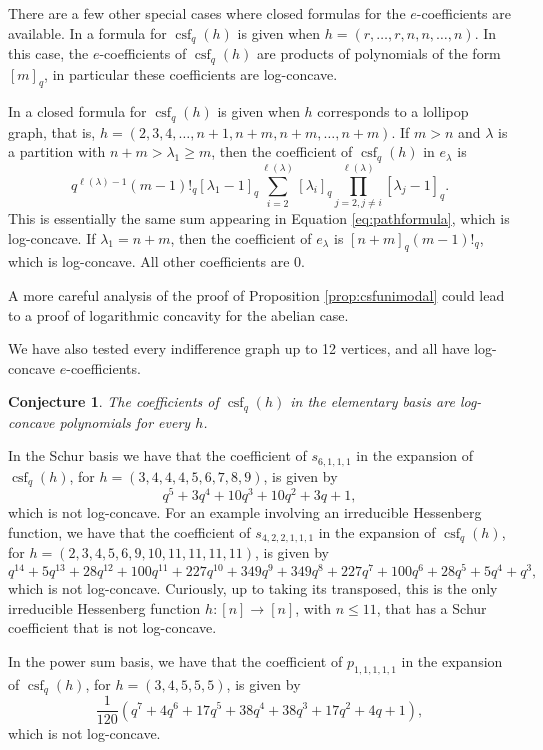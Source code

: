 \documentclass[10pt]{amsart}
\newtheorem{Conjecture}[Lem]{Conjecture}
\theoremstyle{definition}
\newcommand{\col}{\colon}
\DeclareMathOperator{\csf}{csf}
\begin{document}
  There are a few other special cases where closed formulas for the $e$-coefficients are available. In \cite[Theorem 4.2]{Cho} a formula for $\csf_q(h)$ is given when $h=(r,\ldots, r,n,n,\ldots,n)$. In this case, the $e$-coefficients of $\csf_q(h)$ are products of polynomials of the form $[m]_q$, in particular these coefficients are log-concave. \par 
  In \cite[Proposition 4.4]{HNY} a closed formula for $\csf_q(h)$ is given when $h$ corresponds to a lollipop graph, that is, $h=(2,3,4,\ldots, n+1,n+m,n+m,\ldots, n+m)$. If $m> n$ and $\lambda$ is a partition with $n+m>\lambda_1\geq m$, then the coefficient of  $\csf_q(h)$ in $e_{\lambda}$ is
    \[
       q^{\ell(\lambda)-1}(m-1)!_q[\lambda_1-1]_q\sum_{i=2}^{\ell(\lambda)} [\lambda_i]_q\prod_{j=2, j\neq i}^{\ell(\lambda)} [\lambda_j-1]_q.
   \]
 This is essentially the same sum appearing in Equation \eqref{eq:pathformula}, which is log-concave. If $\lambda_1=n+m$, then the coefficient of $e_{\lambda}$ is $[n+m]_q(m-1)!_q$, which is log-concave. All other coefficients are $0$.\par
   A more careful analysis of the proof of Proposition \ref{prop:csfunimodal} could lead to a proof of logarithmic concavity for the abelian case. 
  
  We have also tested every indifference graph up to 12 vertices, and all have log-concave $e$-coefficients.



\begin{Conjecture}
The coefficients of $\csf_q(h)$ in the elementary basis are log-concave polynomials for every $h$.
\end{Conjecture}

In the Schur basis we have that the coefficient of $s_{6,1,1,1}$ in the expansion of $\csf_q(h)$, for $h=(3,4,4,4,5,6,7,8,9)$, is given by
\[
q^5 + 3q^4 + 10q^3 + 10q^2 + 3q + 1,
\]
which is not log-concave. For an example involving an irreducible Hessenberg function, we have that the coefficient of $s_{4,2,2,1,1,1}$ in the expansion of $\csf_q(h)$, for $h=(2,3,4,5,6,9,10,11,11,11,11)$,  is given by 
\[
q^{14} + 5q^{13} + 28q^{12} + 100q^{11} + 227q^{10} + 349q^9 + 349q^8 + 227q^7 + 100q^6 + 28q^5 + 5q^4 + q^3,
\]
which is not log-concave. Curiously, up to taking its transposed, this is the only irreducible Hessenberg function $h\col[n]\to [n]$, with $n\leq 11$, that has a Schur coefficient that is not log-concave.  \par
 In the power sum basis, we have that the coefficient of $p_{1,1,1,1,1}$ in the expansion of $\csf_q(h)$, for $h=(3,4,5,5,5)$, is given by
 \[
\frac{1}{120}(q^7+4q^6+17q^5+38q^4+38q^3+17q^2+4q+1),
 \]
which is not log-concave.








%

\end{document}
